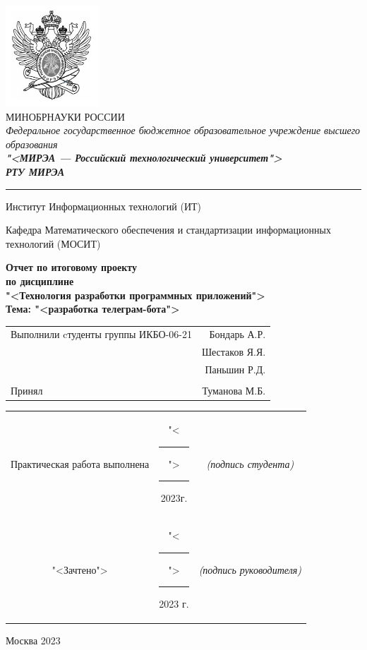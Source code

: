 \begin{center}
	\includegraphics[scale=0.5]{./res/logo.png}\\

	МИНОБРНАУКИ РОССИИ\\
	\textit{Федеральное государственное бюджетное
	образовательное учреждение высшего образования}\\
	\textbf{\textit{"<МИРЭА --- Российский технологический
	университет">}}\\
	\textbf{\textit{\large РТУ МИРЭА}}\\

	\bigskip \hrule \smallskip

	Институт Информационных технологий (ИТ)\\

	\vfill

	Кафедра Математического обеспечения и стандартизации информационных
		технологий (МОСИТ)\\

	\vfill

	\textbf{
		Отчет по итоговому проекту\\
		по дисциплине\\
		"<Технология разработки программных приложений">\\
		Тема: "<разработка телеграм-бота">\\
	}

	\vfill
	\vfill

	\begin{small}
		\begin{tabular}{lr}
			Выполнили cтуденты группы ИКБО-06-21 & Бондарь А.Р.\\
			& Шестаков Я.Я.\\
			& Паньшин Р.Д.\\\\
			Принял & Туманова М.Б.\\
		\end{tabular}
	\end{small}

	\vfill

	\begin{footnotesize}
		\begin{tabular}{ccc}
			Практическая  работа выполнена
			& "<\rule{1ex}{.5pt}">\rule{7ex}{.5pt}2023г.
			& \textit{(подпись студента)}\\
			"<Зачтено"> 
			& "<\rule{1ex}{.5pt}">\rule{7ex}{.5pt}2023 г.
			& \textit{(подпись руководителя)}\\
		\end{tabular}
	\end{footnotesize}

	\vfill

	Москва 2023
\end{center}

\thispagestyle{empty}

